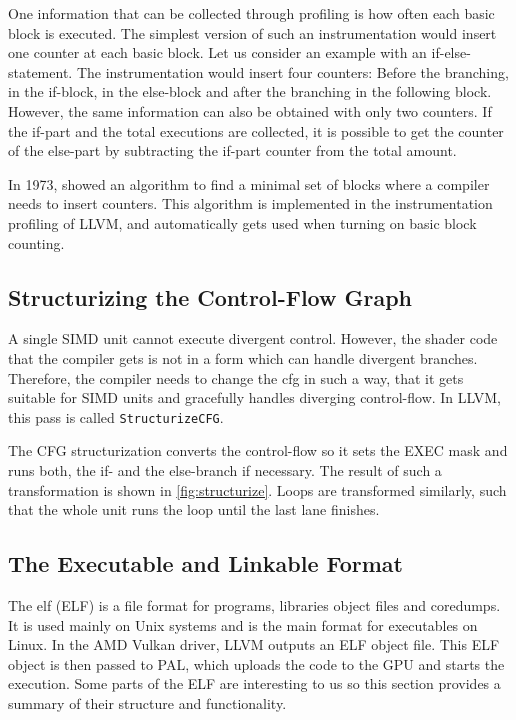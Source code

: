 One information that can be collected through profiling is how often each basic block is executed. The simplest version of such an instrumentation would insert one counter at each basic block.
Let us consider an example with an if-else-statement. The instrumentation would insert four counters: Before the branching, in the if-block, in the else-block and after the branching in the following block.
However, the same information can also be obtained with only two counters.
If the if-part and the total executions are collected, it is possible to get the counter of the else-part by subtracting the if-part counter from the total amount.

In 1973, \citet{Knuth1973} showed an algorithm to find a minimal set of blocks where a compiler needs to insert counters.
This algorithm is implemented in the instrumentation profiling of LLVM, and automatically gets used when turning on basic block counting.

\subsection{Structurizing the Control-Flow Graph}
\label{sub:structurize}
A single SIMD unit cannot execute divergent control. However, the shader code that the compiler gets is not in a form which can handle divergent branches.
Therefore, the compiler needs to change the \gls{cfg} in such a way, that it gets suitable for SIMD units and gracefully handles diverging control-flow.
In LLVM, this pass is called \texttt{StructurizeCFG}.

The CFG structurization converts the control-flow so it sets the EXEC mask and runs both, the if- and the else-branch if necessary. The result of such a transformation is shown in \cref{fig:structurize}. Loops are transformed similarly, such that the whole unit runs the loop until the last lane finishes.

\begin{figure}
	\centering
	
\end{figure}

\subsection{The Executable and Linkable Format}
\label{sub:elf}
The \glsdesc{elf} (ELF) is a file format for programs, libraries object files and coredumps. It is used mainly on Unix systems and is the main format for executables on Linux.
In the AMD Vulkan driver, LLVM outputs an ELF object file. This ELF object is then passed to PAL, which uploads the code to the GPU and starts the execution.
Some parts of the ELF are interesting to us so this section provides a summary of their structure and functionality.

